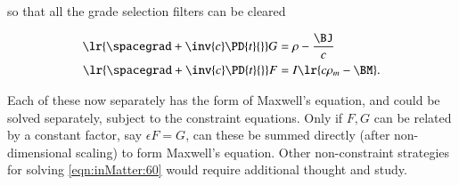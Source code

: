 so that all the grade selection filters can be cleared

\begin{dmath}\label{eqn:inMatter:220}
\begin{aligned}
\lr{ \spacegrad + \inv{c} \PD{t}{} } G &= \rho - \frac{\BJ}{c} \\
\lr{ \spacegrad + \inv{c} \PD{t}{} } F &= I \lr{ c \rho_m - \BM }.
\end{aligned}
\end{dmath}

Each of these now separately has the form of Maxwell's equation, and could be solved separately, subject to the constraint equations.
Only if \( F, G \) can be related by a constant factor, say \( \epsilon F = G \), can these be summed directly (after non-dimensional scaling) to form Maxwell's equation.
Other non-constraint strategies for solving \cref{eqn:inMatter:60} would require additional thought and study.
